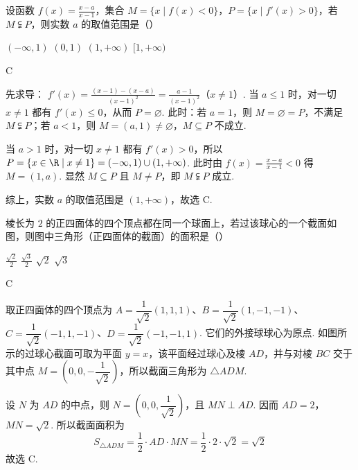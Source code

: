 \begin{problem}
设函数 \( f(x) = \frac{x - a}{x - 1} \)，集合 \( M = \{x \mid f(x) < 0\} \)，\( P = \{x \mid f'(x) > 0\} \)，若 \( M \subsetneqq P \)，则实数 \( a \) 的取值范围是（\quad）

\choices
    {\((- \infty, 1)\)}
    {\((0,1)\)}
    {\((1, +\infty)\)}
    {\([1, +\infty)\)}
\end{problem}

\begin{answer}
C
\end{answer}

\begin{solution}
先求导：
\(f'(x)=\frac{(x-1)-(x-a)}{(x-1)^2}=\frac{a-1}{(x-1)^2}\)（\(x\ne1\)）.
当 \(a\leqslant1\) 时，对一切 \(x\ne1\) 都有 \(f'(x)\leqslant0\)，从而 \(P=\varnothing\). 此时：若 \(a=1\)，则 \(M=\varnothing=P\)，不满足 \(M\subsetneqq P\)；若 \(a<1\)，则 \(M=(a,1)\ne\varnothing\)，\(M\subseteq P\) 不成立.

当 \(a>1\) 时，对一切 \(x\ne1\) 都有 \(f'(x)>0\)，所以 \(P=\{x\in\R\mid x\ne1\}=(-\infty,1)\cup(1,+\infty)\). 此时由 \(f(x)=\frac{x-a}{x-1}<0\) 得 \(M=(1,a)\). 显然 \(M\subseteq P\) 且 \(M\ne P\)，即 \(M\subsetneqq P\) 成立.

综上，实数 \(a\) 的取值范围是 \((1,+\infty)\)，故选 C.
\end{solution}

\begin{problem}
棱长为 \(2\) 的正四面体的四个顶点都在同一个球面上，若过该球心的一个截面如图，则图中三角形（正四面体的截面）的面积是（\quad）


\choices
    {\(\frac{\sqrt{2}}{2}\)}
    {\(\frac{\sqrt{3}}{2}\)}
    {\(\sqrt{2}\)}
    {\(\sqrt{3}\)}
\end{problem}

\begin{answer}
C
\end{answer}

\begin{solution}
取正四面体的四个顶点为 \(A=\dfrac1{\sqrt2}(1,1,1)\)、\(B=\dfrac1{\sqrt2}(1,-1,-1)\)、\(C=\dfrac1{\sqrt2}(-1,1,-1)\)、\(D=\dfrac1{\sqrt2}(-1,-1,1)\).
它们的外接球球心为原点. 如图所示的过球心截面可取为平面 \(y=x\)，该平面经过球心及棱 \(AD\)，并与对棱 \(BC\) 交于其中点 \(M=\left(0,0,-\dfrac1{\sqrt2}\right)\)，所以截面三角形为 \(\triangle ADM\).

设 \(N\) 为 \(AD\) 的中点，则 \(N=\left(0,0,\dfrac1{\sqrt2}\right)\)，且 \(MN\perp AD\). 因而 \(AD=2\)，\(MN=\sqrt2\).
所以截面面积为
\[
S_{\triangle ADM}=\frac12\cdot AD\cdot MN=\frac12\cdot2\cdot\sqrt2=\sqrt2
\]
故选 C.
\end{solution}

